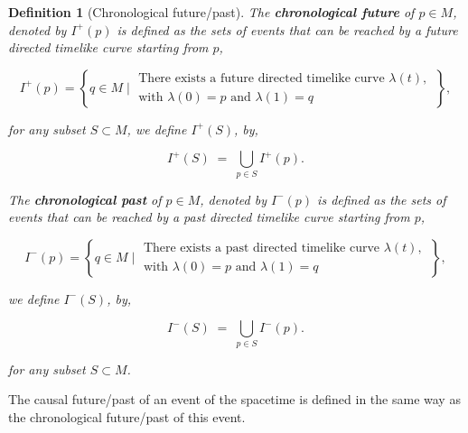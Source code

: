 \documentclass[10pt]{book}
\theoremstyle{break}
\newtheorem{definition}{Definition}
\begin{document}
\begin{definition}[Chronological future/past]
The \textbf{chronological future} of $p \in M$, denoted by $I^{+}(p)$ is defined as the sets of events that can be reached by a future directed timelike curve starting from $p$,

\begin{equation*}
I^{+}(p) = \left\{ q \in M \; \bigg| \; \begin{array}{l} \text{There exists a future directed timelike curve $\lambda(t)$,} \\ \text{with $\lambda(0)=p$ and $\lambda(1)=q$} \end{array} \; \right\},
\end{equation*}

for any subset $S \subset M$, we define $I^{+}(S)$, by,

\begin{equation*}
I^{+}(S) \; = \; \bigcup_{p \in S} I^{+}(p). 
\end{equation*}

The \textbf{chronological past} of $p \in M$, denoted by $I^{-}(p)$ is defined as the sets of events that can be reached by a past directed timelike curve starting from $p$,

\begin{equation*}
I^{-}(p) = \left\{ q \in M \; \bigg| \; \begin{array}{l} \text{There exists a past directed timelike curve $\lambda(t)$,} \\ \text{with $\lambda(0)=p$ and $\lambda(1)=q$} \end{array} \; \right\},
\end{equation*}

we define $I^{-}(S)$, by,

\begin{equation*}
I^{-}(S) \; = \; \bigcup_{p \in S} I^{-}(p). 
\end{equation*}

for any subset $S \subset M$. 

\end{definition}

The causal future/past of an event of the spacetime is defined in the same way as the chronological future/past of this event.
\end{document}

